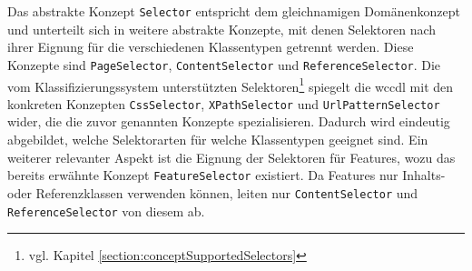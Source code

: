     Das abstrakte Konzept \texttt{Selector} entspricht dem gleichnamigen Domänenkonzept
    und unterteilt sich in weitere abstrakte Konzepte,
    mit denen Selektoren nach ihrer Eignung für die verschiedenen Klassentypen getrennt werden.
    Diese Konzepte sind \texttt{PageSelector}, \texttt{ContentSelector} und \texttt{ReferenceSelector}.
    Die vom Klassifizierungssystem unterstützten
    Selektoren\footnote{vgl. Kapitel \ref{section:conceptSupportedSelectors}}
    spiegelt die \gls{wccdl} mit den konkreten Konzepten
    \texttt{CssSelector}, \texttt{XPathSelector} und \texttt{UrlPatternSelector} wider,
    die die zuvor genannten Konzepte spezialisieren.
    Dadurch wird eindeutig abgebildet, welche Selektorarten für welche Klassentypen geeignet sind.
    Ein weiterer relevanter Aspekt ist die Eignung der Selektoren für Features,
    wozu das bereits erwähnte Konzept \texttt{FeatureSelector} existiert.
    Da Features nur Inhalts- oder Referenzklassen verwenden können,
    leiten nur \texttt{ContentSelector} und \texttt{ReferenceSelector} von diesem ab.
    